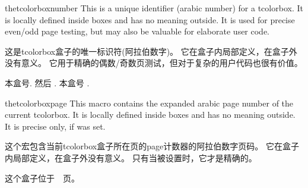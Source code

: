 \begin{docCommand}[doc new=2015-11-13]{thetcolorboxnumber}{}
 This is a unique identifier (arabic number) for a tcolorbox. It is locally
 defined inside boxes and has no meaning outside. It is used for
 precise even/odd page testing, but may also be valuable for elaborate user
 code.

这是tcolorbox盒子的唯一标识符(阿拉伯数字)。 %
它在盒子内局部定义，在盒子外没有意义。%
它用于精确的偶数/奇数页测试，但对于复杂的用户代码也很有价值。

\begin{dispExample}
\begin{tcolorbox}[colback=yellow!5,title=Box \thetcolorboxnumber]
本盒号\thetcolorboxnumber.
 然后
.
本盒号 \thetcolorboxnumber.
\end{tcolorbox}
\end{dispExample}
\end{docCommand}



\begin{docCommand}[doc new=2015-11-13]{thetcolorboxpage}{}
 This macro contains the expanded arabic page number of the current tcolorbox.
 It is locally defined inside boxes and has no meaning outside.
 It is precise only, if  was set.

这个宏包含当前tcolorbox盒子所在页的page计数器的阿拉伯数字页码。%
它在盒子内局部定义，在盒子外没有意义。%
只有当被设置时，它才是精确的。

\begin{dispExample}
\begin{tcolorbox}[colback=yellow!5,check odd page,
    title=Box on page~\thetcolorboxpage]
这个盒子位于~\thetcolorboxpage~页。
\end{tcolorbox}
\end{dispExample}
\end{docCommand}
